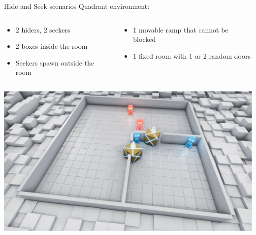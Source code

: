 \documentclass{beamer}
\begin{document}
\begin{frame}{Hide and Seek scenarios}
Quadrant environment:
\begin{columns}
\begin{column}{0.5\textwidth}
\begin{itemize}
    \item 2 hiders, 2 seekers
    \item 2 boxes inside the room
    \item Seekers spawn outside the room
    \end{itemize}{}
\end{column}
\begin{column}{0.5\textwidth}  %
    \begin{itemize}
    \item 1 movable ramp that cannot be blocked
    \item 1 fixed room with 1 or 2 random doors
    \end{itemize}{}
\end{column}
\end{columns}
\begin{center}
    \includegraphics[scale=0.25]{quadrant.png}
\end{center}{}
\end{frame}
\end{document}
